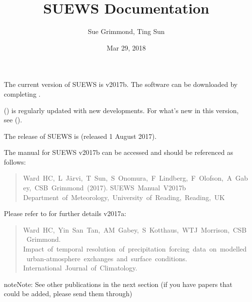 \documentclass[letterpaper,10pt,english]{sphinxmanual}
\title{SUEWS Documentation}
\date{Mar 29, 2018}
\author{Sue Grimmond, Ting Sun}
\begin{document}
\maketitle
\sphinxtableofcontents
{}\label{\detokenize{index::doc}}


The current version of SUEWS is v2017b. The software can be downloaded
by completing .

{\hyperref[\detokenize{index:index-page}]{}} () is regularly
updated with new developments. For what’s new in this version, see {\hyperref[\detokenize{version-history:new-latest}]{}} ().

The  release of SUEWS is  (released 1 August
2017).

The manual for SUEWS v2017b can be accessed
 and should be referenced as
follows:
\begin{quote}

Ward HC, L Järvi, T Sun, S Onomura, F Lindberg, F Olofson, A Gabey, CSB Grimmond (2017).
SUEWS Manual V2017b Department of Meteorology, University of Reading, Reading, UK
\end{quote}

Please refer to  for
further details v2017a:
\begin{quote}

Ward HC, Yin San Tan, AM Gabey, S Kotthaus, WTJ Morrison, CSB Grimmond.
Impact of temporal resolution of precipitation forcing data on modelled urban-atmosphere exchanges and surface conditions.
International Journal of Climatology.
\end{quote}

\begin{sphinxadmonition}{note}{Note:}
See other publications in the next section (if you have papers that could be added, please send them through)
\end{sphinxadmonition}
\end{document}
